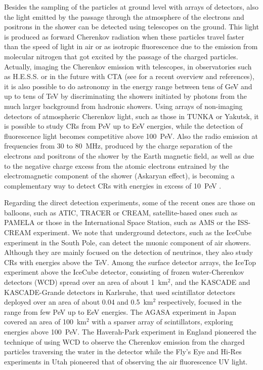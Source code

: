 \documentclass[twoside,12pt]{article}
\begin{document}
Besides the sampling of the particles at ground level with arrays of detectors, also the light emitted by the passage through the atmosphere of the electrons and positrons  in the shower can be detected using telescopes on the ground. This light is produced  as forward Cherenkov radiation when these particles travel faster than the speed of light in air or as isotropic fluorescence due to the emission from molecular nitrogen that got excited by the passage of the charged particles. Actually, imaging  the Cherenkov emission with telescopes, in observatories such as H.E.S.S. or in the future with CTA (see \cite{gamma} for a recent overview and references), it is also possible to do astronomy in the energy range between tens of GeV and up to tens of TeV by discriminating the showers initiated by photons from the much larger background from hadronic showers. Using arrays of non-imaging detectors of atmospheric  Cherenkov light, such as those in TUNKA or Yakutsk, it is possible to study CRs from PeV up to EeV energies, while the detection of fluorescence light becomes competitive above 100~PeV.  Also the radio emission at frequencies from 30 to 80~MHz, produced by the charge separation of the electrons and positrons of the shower by the Earth magnetic field, as well as due to the negative charge excess from the atomic electrons entrained by the electromagnetic component of the shower (Askaryan effect), is becoming a complementary way to detect CRs with energies in excess of 10~PeV \cite{schroeder}.

Regarding the direct detection experiments, some of the recent ones are those on balloons, such as ATIC, TRACER or CREAM, satellite-based ones such as PAMELA  or those in the International Space Station, such as AMS or the ISS-CREAM  experiment. We note that underground detectors, such as the IceCube experiment in the South Pole, can detect the muonic component of air showers. Although they are mainly focused on the detection of neutrinos, they also study CRs with energies above the TeV. 
Among the surface detector arrays, the IceTop experiment above the IceCube detector, consisting of frozen water-Cherenkov detectors (WCD) spread over an area of about 1~km$^2$, and the KASCADE and KASCADE-Grande detectors in Karlsruhe, that used scintillator detectors deployed over an area of about 0.04 and 0.5~km$^2$ respectively,  focused in the  range from  few PeV up to EeV energies. The AGASA experiment in Japan covered an area of 100~km$^2$ with a sparser array of scintillators, exploring energies above 100~PeV. The Haverah-Park experiment in England pioneered the technique of using WCD to observe the Cherenkov emission from the charged particles traversing the water in the detector while the Fly's Eye and Hi-Res experiments in Utah pioneered that of observing the air fluorescence UV light. 
\end{document}
